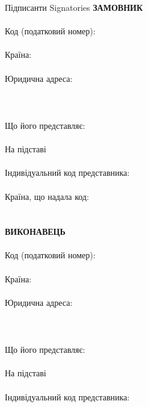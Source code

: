 \begin{Form}
\begin{paracol}{3}
      \clausenewpage
        {Підписанти}
        {Signatories}
        {}
        {\textbf{ЗАМОВНИК}\\
        \\
        Код (податковий номер):\\
        \\
        Країна:\\
        \\
        Юридична адреса:\\
        \\
        \\
        \\
        Що його представляє:\\
        \\
        На підставі\\
        \\
        Індивідуальний код представника:\\
        \\
        Країна, що надала код:\\
        \\
        \\
        \textbf{ВИКОНАВЕЦЬ}\\
        \\
        Код (податковий номер):\\
        \\
        Країна:\\
        \\
        Юридична адреса:\\
        \\
        \\
        \\
        Що його представляє:\\
        \\
        На підставі\\
        \\
        Індивідуальний код представника:\\
        \\
}
\end{paracol}
\end{Form}
